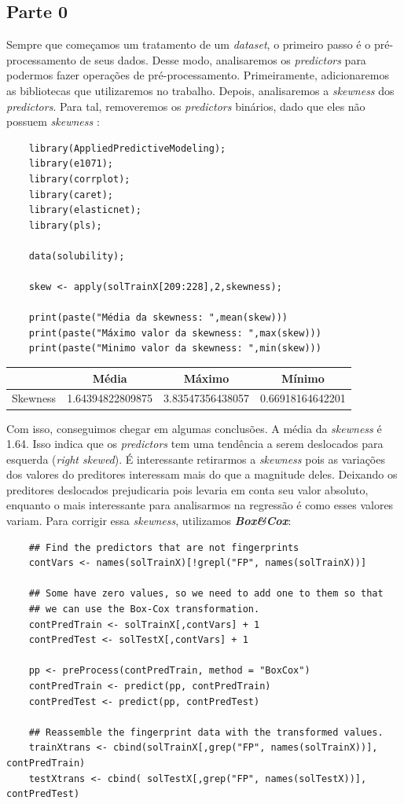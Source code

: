 \documentclass[a4paper,11pt]{article}
\begin{document}
	\begin{center}
		\section*{Parte 0}
	\end{center}
	Sempre que começamos um tratamento de um \textit{dataset}, o primeiro passo é o pré-processamento de seus dados. Desse modo, analisaremos os \textit{predictors} para podermos fazer operações de pré-processamento. Primeiramente, adicionaremos as bibliotecas que utilizaremos no trabalho. Depois, analisaremos a \textit{skewness} dos \textit{predictors}. Para tal, removeremos os \textit{predictors} binários, dado que eles não possuem \textit{skewness} :\\
	\begin{verbatim}
	library(AppliedPredictiveModeling);
	library(e1071);
	library(corrplot);
	library(caret);
	library(elasticnet);
	library(pls);
	
	data(solubility);
	
	skew <- apply(solTrainX[209:228],2,skewness);
	
	print(paste("Média da skewness: ",mean(skew)))
	print(paste("Máximo valor da skewness: ",max(skew)))
	print(paste("Minimo valor da skewness: ",min(skew)))
	\end{verbatim}
	\vskip0.4cm
	\begin{tabular}{ c c c c }
		         & Média & Máximo & Mínimo \\
		\hline
		Skewness & 1.64394822809875 & 3.83547356438057 & 0.66918164642201  	
	\end{tabular}
	\newpage
	Com isso, conseguimos chegar em algumas conclusões. A média da \textit{skewness} é 1.64. Isso indica que os \textit{predictors} tem uma tendência a serem deslocados para esquerda (\textit{right skewed}). É interessante retirarmos a \textit{skewness} pois as variações dos valores do preditores interessam mais do que a magnitude deles. Deixando os preditores deslocados prejudicaria pois levaria em conta seu valor absoluto, enquanto o mais interessante para analisarmos na regressão é como esses valores variam. Para corrigir essa \textit{skewness}, utilizamos \textbf\textit{{Box\&Cox}}:
	\begin{verbatim}
	## Find the predictors that are not fingerprints
	contVars <- names(solTrainX)[!grepl("FP", names(solTrainX))]
	
	## Some have zero values, so we need to add one to them so that
	## we can use the Box-Cox transformation.
	contPredTrain <- solTrainX[,contVars] + 1
	contPredTest <- solTestX[,contVars] + 1
	
	pp <- preProcess(contPredTrain, method = "BoxCox")
	contPredTrain <- predict(pp, contPredTrain)
	contPredTest <- predict(pp, contPredTest)
	
	## Reassemble the fingerprint data with the transformed values.
	trainXtrans <- cbind(solTrainX[,grep("FP", names(solTrainX))], contPredTrain)
	testXtrans <- cbind( solTestX[,grep("FP", names(solTestX))], contPredTest)
	\end{verbatim}
\end{document}
